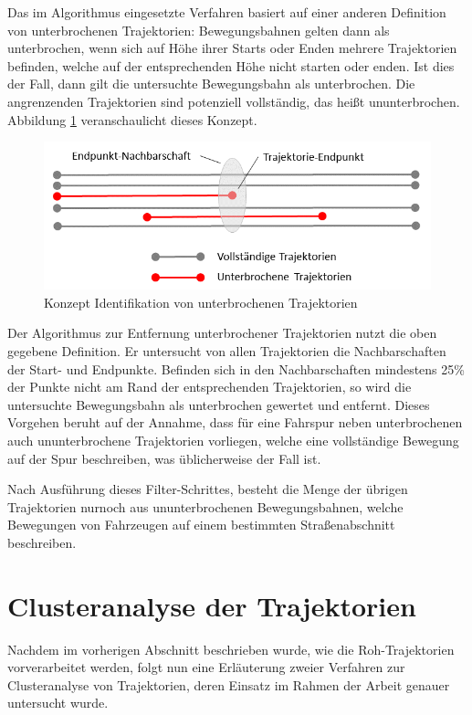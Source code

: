 Das im Algorithmus eingesetzte Verfahren basiert auf einer anderen Definition von unterbrochenen
Trajektorien: Bewegungsbahnen gelten dann als unterbrochen, wenn sich auf Höhe ihrer Starts
oder Enden mehrere Trajektorien befinden, welche auf der entsprechenden Höhe nicht starten oder enden.
Ist dies der Fall, dann gilt die untersuchte Bewegungsbahn als unterbrochen. Die angrenzenden Trajektorien
sind potenziell vollständig, das heißt ununterbrochen.
Abbildung \ref{fig:real_completeTrajectory} veranschaulicht dieses Konzept.

\begin{figure}[H]
\centering
    \includegraphics[width=0.6\linewidth]{resources/img/umsetzung/U1/complete_trajectories_concept}
\caption{Konzept Identifikation von unterbrochenen Trajektorien}
\label{fig:real_completeTrajectory}
\end{figure}

Der Algorithmus zur Entfernung unterbrochener Trajektorien nutzt die oben gegebene Definition.
Er untersucht von allen Trajektorien die Nachbarschaften der Start- und Endpunkte. Befinden sich in
den Nachbarschaften mindestens 25\% der Punkte nicht am Rand der entsprechenden Trajektorien, so wird
die untersuchte Bewegungsbahn als unterbrochen gewertet und entfernt.
Dieses Vorgehen beruht auf der Annahme, dass für eine Fahrspur neben unterbrochenen auch
ununterbrochene Trajektorien vorliegen, welche eine vollständige Bewegung auf der Spur beschreiben,
was üblicherweise der Fall ist.

Nach Ausführung dieses Filter-Schrittes, besteht die Menge der übrigen Trajektorien nurnoch
aus ununterbrochenen Bewegungsbahnen, welche Bewegungen von Fahrzeugen auf einem bestimmten
Straßenabschnitt beschreiben.

\section{Clusteranalyse der Trajektorien}
\label{sec:realisation_clustering}

Nachdem im vorherigen Abschnitt beschrieben wurde, wie die Roh-Trajektorien vorverarbeitet
werden, folgt nun eine Erläuterung zweier Verfahren zur Clusteranalyse von Trajektorien, deren Einsatz
im Rahmen der Arbeit genauer untersucht wurde.

